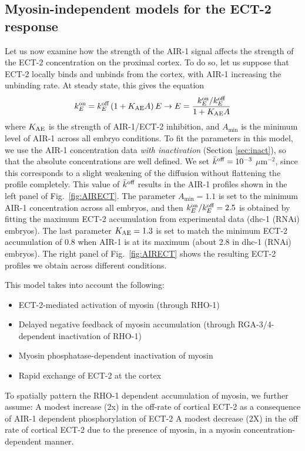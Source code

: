 \documentclass[11pt]{article}
\begin{document}
\subsection{Myosin-independent models for the ECT-2 response}
Let us now examine how the strength of the AIR-1 signal affects the strength of the ECT-2 concentration on the proximal cortex. To do so, let us suppose that ECT-2 locally binds and unbinds from the cortex, with AIR-1 increasing the unbinding rate. At steady state, this gives the equation
\begin{equation}
\label{eq:EctA}
 k^\text{on}_E = k^\text{off}_E \left(1+K_\text{AE} A \right)E \rightarrow E = \frac{k^\text{on}_E/ k^\text{off}_E}{ 1+K_\text{AE} A}
\end{equation}
where $K_\text{AE}$ is the strength of AIR-1/ECT-2 inhibition, and $A_\text{min}$ is the minimum level of AIR-1 across all embryo conditions. To fit the parameters in this model, we use the AIR-1 concentration data \emph{with inactivation} (Section \ref{sec:inact}), so that the absolute concentrations are well defined. We set $\bar{k}^\text{off}=10^{-3}$ $\mu$m$^{-2}$, since this corresponds to a slight weakening of the diffusion without flattening the profile completely. This value of $\bar{k}^\text{off}$ results in the AIR-1 profiles shown in the left panel of Fig.\ \ref{fig:AIRECT}. The parameter $A_\text{min}=1.1$ is set to the minimum AIR-1 concentration across all embryos, and then $k^\text{on}_E/ k^\text{off}_E=2.5$ is obtained by fitting the maximum ECT-2 accumulation from experimental data (dhc-1 (RNAi) embryos). The last parameter $K_\text{AE}=1.3$ is set to match the minimum ECT-2 accumulation of 0.8 when AIR-1 is at its maximum (about 2.8 in dhc-1 (RNAi) embryos). The right panel of Fig.\ \ref{fig:AIRECT} shows the resulting ECT-2 profiles we obtain across different conditions. 



This model takes into account the following:
\begin{itemize}
\item ECT-2-mediated activation of myosin (through RHO-1)
\item Delayed negative feedback of myosin accumulation (through RGA-3/4-dependent inactivation of RHO-1)
\item Myosin phosphatase-dependent inactivation of myosin
\item Rapid exchange of ECT-2 at the cortex
\end{itemize}
To spatially pattern the RHO-1 dependent accumulation of myosin, we further assume:
A modest increase (2x) in the off-rate of cortical ECT-2 as a consequence of AIR-1 dependent phosphorylation of ECT-2
A modest decrease (2X) in the off rate of cortical ECT-2 due to the presence of myosin, in a myosin concentration-dependent manner.
\end{document}
